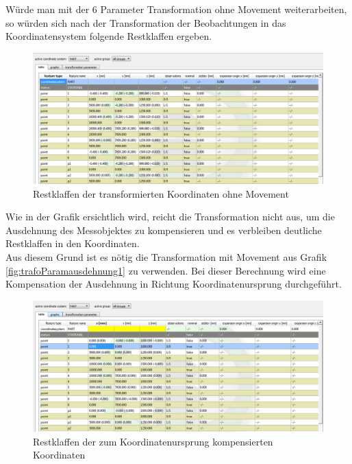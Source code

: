 Würde man mit der 6 Parameter Transformation ohne Movement weiterarbeiten, so würden sich nach der Transformation der Beobachtungen in das Koordinatensystem folgende Restklaffen ergeben.
\newpage
\begin{figure}[h]
\label{fig:koordausdehnung1ohnecomp}
\centering
	\includegraphics[scale=1.7]{bilder/Testmessung/ursprungecke/koordsausdehnung1ohnecomp}
	\caption{Restklaffen der transformierten Koordinaten ohne Movement}
\end{figure}
Wie in der Grafik ersichtlich wird, reicht die Transformation nicht aus, um die Ausdehnung des Messobjektes zu kompensieren und es verbleiben deutliche Restklaffen in den Koordinaten.\\
Aus diesem Grund ist es nötig die Transformation mit Movement aus Grafik \ref{fig:trafoParamausdehnung1} zu verwenden. Bei dieser Berechnung wird eine Kompensation der Ausdehnung in Richtung Koordinatenursprung durchgeführt.

\begin{figure}[H]
\label{fig:koordausdehnung1}
\centering
	\includegraphics[scale=1.7]{bilder/Testmessung/ursprungecke/koordsausdehnung1}
	\caption{Restklaffen der zum Koordinatenursprung kompensierten Koordinaten}
\end{figure}

